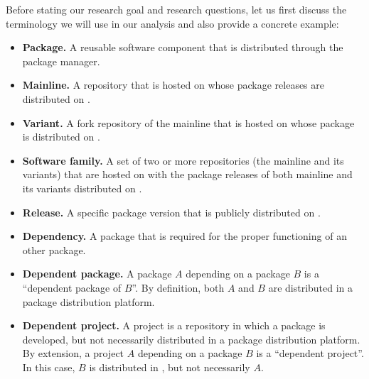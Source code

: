 Before stating our research goal and research questions, let us first discuss the terminology we will use in our analysis and also provide a concrete example: 

\begin{itemize}
    \item \textbf{Package.} A reusable software component that is distributed through the \np package manager.
    
    \item \textbf{Mainline.} A repository that is hosted on \gh 
    whose package releases are distributed on \npm.

    \item \textbf{Variant.} A fork repository of the mainline that is hosted on \gh whose package is distributed on \npm.

    \item \textbf{Software family.} A set of two or more repositories (the mainline and its variants) that are hosted on \gh with the package releases of both mainline and its variants distributed on \npm.

    
    \item \textbf{Release.} A specific package version that is publicly distributed on \npm.

     \item \textbf{Dependency.} A package that is required for the proper functioning of an other package.

    \item \textbf{Dependent package.}  A package $A$ depending on a package $B$ is a ``dependent package of $B$''. By definition, both $A$ and $B$ are distributed in a package distribution platform. %
    
      \item \textbf{Dependent project.} A project is a repository in which a package is developed, but not necessarily distributed in a package distribution platform. By extension, a project $A$ depending on a package $B$ is a ``dependent project''. In this case, $B$ is distributed in \npm, but not necessarily $A$.

\end{itemize}

